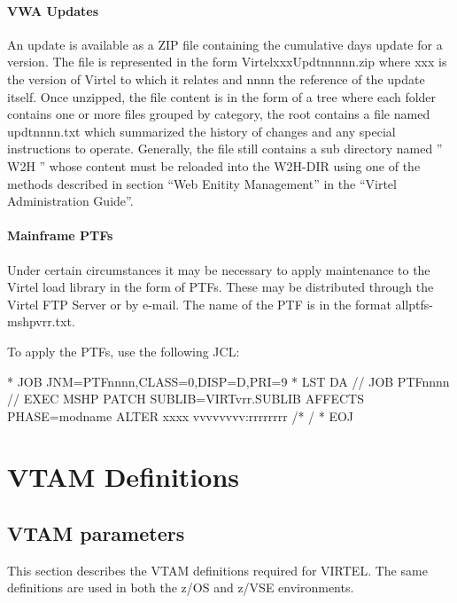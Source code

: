 \documentclass[letterpaper,10pt,english]{sphinxmanual}
\begin{document}
\subsubsection{VWA Updates}
\label{\detokenize{Installation_Guide:vwa-updates}}
An update is available as a ZIP file containing the cumulative days update for a version. The file is represented in the form VirtelxxxUpdtnnnnn.zip where xxx is the version of Virtel to which it relates and nnnn the reference of the update itself. Once unzipped, the file content is in the form of a tree where each folder contains one or more files grouped by category, the root contains a file named updtnnnn.txt which summarized the history of changes and any special instructions to operate. Generally, the file still contains a sub directory named ” W2H ” whose content must be reloaded into the W2H-DIR using one of the methods described in section “Web Enitity Management” in the “Virtel Administration Guide”.


\subsubsection{Mainframe PTFs}
\label{\detokenize{Installation_Guide:mainframe-ptfs}}
Under certain circumstances it may be necessary to apply maintenance to the Virtel load library in the form of PTFs. These may be distributed through the Virtel FTP Server or by e-mail. The name of the PTF is in the format allptfs-mshpvrr.txt.

To apply the PTFs, use the following JCL:

\begin{sphinxVerbatim}[commandchars=\\\{\}]
* \PYGZdl{}\PYGZdl{} JOB JNM=PTFnnnn,CLASS=0,DISP=D,PRI=9
* \PYGZdl{}\PYGZdl{} LST DA
// JOB PTFnnnn
// EXEC MSHP
  PATCH SUBLIB=VIRTvrr.SUBLIB
  AFFECTS PHASE=modname
  ALTER xxxx vvvvvvvv:rrrrrrrr
/*
/\PYGZam{}
* \PYGZdl{}\PYGZdl{} EOJ
\end{sphinxVerbatim}



\chapter{VTAM Definitions}
\label{\detokenize{Installation_Guide:index-21}}\label{\detokenize{Installation_Guide:vtam-definitions}}

\section{VTAM parameters}
\label{\detokenize{Installation_Guide:vtam-parameters}}
This section describes the VTAM definitions required for VIRTEL. The same definitions are used in both the z/OS and z/VSE environments.
\end{document}
